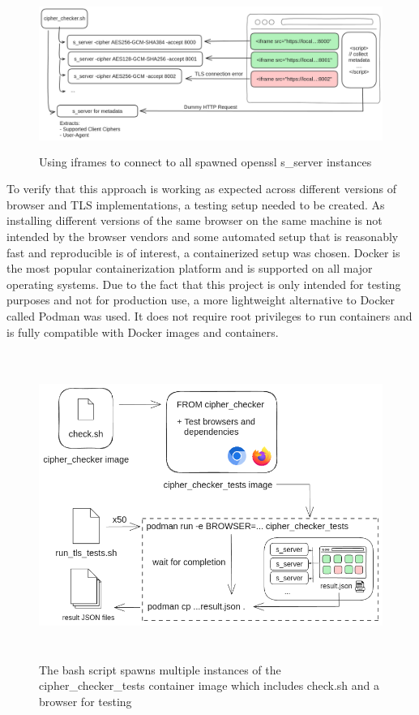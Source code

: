 \documentclass[12pt]{scrbook}
\begin{document}
\begin{figure}
	\centering
	\includegraphics[height=5cm]{./images/cipher_check_setup.png}
	\caption{Using iframes to connect to all spawned openssl s\_server instances}
\end{figure}

\newpage

To verify that this approach is working as expected across different versions of
browser and TLS implementations, a testing setup needed to be created.
As installing different versions of the same browser on the same machine is not
intended by the browser vendors and some automated setup that is reasonably fast and reproducible is of interest, a
containerized setup was chosen.
Docker is the most popular containerization platform and is supported on all
major operating systems. Due to the fact that this project is only intended for testing purposes and not
for production use, a more lightweight alternative to Docker called Podman was used. It does not require root privileges to run
containers and is fully compatible with Docker images and containers.

\begin{figure}[!h]
	\centering
	\includegraphics[height=10cm]{./images/cipher_checker_tests.png}
	\caption{The bash script spawns multiple instances of the
		cipher\_checker\_tests container image which includes check.sh and a browser for testing}
\end{figure}
\end{document}

